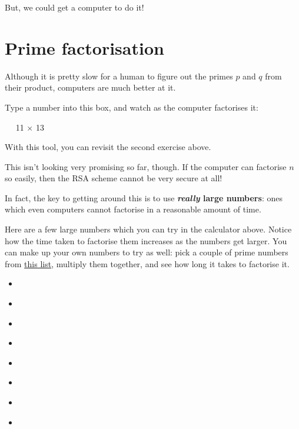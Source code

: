 \documentclass[
  letterpaper,
  DIV=11,
  numbers=noendperiod]{scrreprt}
\providecommand{\tightlist}{%
  \setlength{\itemsep}{0pt}\setlength{\parskip}{0pt}}\usepackage{longtable,booktabs,array}
\begin{document}
But, we could get a computer to do it!

\hypertarget{prime-factorisation}{%
\section{Prime factorisation}\label{prime-factorisation}}

Although it is pretty slow for a human to figure out the primes \(p\)
and \(q\) from their product, computers are much better at it.

Type a number into this box, and watch as the computer factorises it:

\leavevmode{}%
~~ \protect\hypertarget{factorise-result}{}{11 × 13}~~
\protect\hypertarget{factorise-time}{}{}

With this tool, you can revisit the second exercise above.

This isn't looking very promising so far, though. If the computer can
factorise \(n\) so easily, then the RSA scheme cannot be very secure at
all!

In fact, the key to getting around this is to use \textbf{\emph{really}
large numbers}: ones which even computers cannot factorise in a
reasonable amount of time.

Here are a few large numbers which you can try in the calculator above.
Notice how the time taken to factorise them increases as the numbers get
larger. You can make up your own numbers to try as well: pick a couple
of prime numbers from
\href{http://compoasso.free.fr/primelistweb/page/prime/liste_online_en.php}{this
list}, multiply them together, and see how long it takes to factorise
it.

\begin{itemize}
\tightlist
\item
  \protect\hypertarget{example1}{}{}~
\item
  \protect\hypertarget{example2}{}{}~
\item
  \protect\hypertarget{example3}{}{}~
\item
  \protect\hypertarget{example4}{}{}~
\item
  \protect\hypertarget{example5}{}{}~
\item
  \protect\hypertarget{example6}{}{}~
\item
  \protect\hypertarget{example7}{}{}~
\item
  \protect\hypertarget{example8}{}{}~
\end{itemize}
\end{document}
